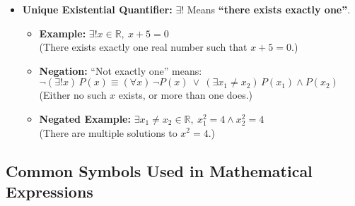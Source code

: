 \begin{itemize}[label=\(-\)]
	\item\textbf{Unique Existential Quantifier:}  \(\exists!\)
		Means \textbf{``there exists exactly one''}.

		\begin{itemize}
			\item \textbf{Example:}  \(\exists! x \in \mathbb{R},\ x + 5 = 0\) \\
			      (There exists exactly one real number such that \( x + 5 = 0 \).)

			\item \textbf{Negation:}  ``Not exactly one'' means:
			      \(
				      \neg (\exists! x)\, P(x) \equiv (\forall x)\, \neg P(x)\ \lor\ (\exists x_1 \neq x_2)\, P(x_1) \land P(x_2)
			      \)
			      (Either no such \( x \) exists, or more than one does.)

			\item \textbf{Negated Example:}  \(\exists x_1 \neq x_2 \in \mathbb{R},\ x_1^2 = 4 \land x_2^2 = 4\) \\
			      (There are multiple solutions to \( x^2 = 4 \).)
		\end{itemize}

\end{itemize}
\subsection{Common Symbols Used in Mathematical Expressions}

